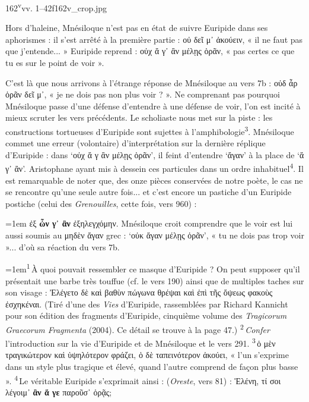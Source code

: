 \documentclass{thesmo}
\begin{document}
\begin{folio}{162\textsuperscript{v}}{vv. 1–42}{f162v_crop.jpg}
\begin{texte}
{Hors d'haleine, Mnésiloque n'est pas en état de suivre Euripide dans ses aphorismes : il s'est arrêté à la première partie : οὐ δεῖ μ᾽ ἀκούειν, « il ne faut pas que j'entende... » Euripide reprend : οὐχ ἅ γ᾽ ἂν μέλῃς ὁρᾶν, « pas certes ce que tu es sur le point de voir ».\par 
C'est là que nous arrivons à l'étrange réponse de Mnésiloque au vers 7b : οὐδ ἆρ ὁρᾶν δεῖ μ᾽, « je ne dois pas non plus voir ? ». Ne comprenant pas pourquoi  Mnésiloque passe d'une défense d'entendre à une défense de voir, l'on est incité à mieux scruter les vers précédents. 
Le scholiaste nous met sur la piste : les constructions tortueuses d'Euripide sont sujettes à l'amphibologie\textsuperscript{3}.
Mnésiloque commet une erreur (volontaire) d'interprétation sur la dernière réplique d'Euripide : dans `οὐχ ἅ γ ἂν μέλῃς ὁρᾶν', il feint d'entendre `ἄγαν' à la place de `ἅ γ᾽ ἂν'. Aristophane ayant mis à dessein ces particules dans un ordre inhabituel\textsuperscript{4}.
Il est remarquable de noter que, des onze pièces conservées de notre poète, le cas ne se rencontre qu'une seule autre fois... et c'est encore un pastiche d'un Euripide postiche (celui des \textit{Grenouilles}, cette fois, vers 960) :
\par{\leftskip=1em ἐξ \textbf{ὧν γ᾽ ἂν} ἐξηλεγχόμην.}
Mnésiloque croit comprendre que le voir est lui aussi soumis au μηδὲν ἄγαν grec : `οὐκ ἄγαν μέλῃς ὁρᾶν', « tu ne dois pas trop voir »... d'où sa réaction du vers 7b.\par 
\par{\fontsize{7.6}{9.4}\selectfont\leftskip=1em\noindent \textsuperscript{1}\,À quoi pouvait ressembler ce masque d'Euripide ? On peut supposer qu'il présentait une barbe très touffue (cf. le vers 190) ainsi que de multiples taches sur son visage : Ἐλέγετο δὲ καὶ βαθὺν πώγωνα θρέψαι καὶ ἐπὶ τῆς ὄψεως φακοὺς ἐσχηκέναι. (Tiré d'une des \textit{Vies} d'Euripide, rassemblées par Richard Kannicht pour son édition des fragments d'Euripide, cinquième volume des \textit{Tragicorum Graecorum Fragmenta} (2004). Ce détail se trouve à la page 47.) \textsuperscript{2}\,\textit{Confer} l'introduction sur la vie d'Euripide et de Mnésiloque et le vers 291. 
 \textsuperscript{3}\,ὁ μὲν τραγικώτερον καὶ ὑψηλότερον φράζει, ὁ δὲ ταπεινότερον ἀκούει, « l'un s'exprime dans un style plus tragique et élevé, quand l'autre comprend de façon plus basse ». \textsuperscript{4}\,Le véritable Euripide s'exprimait ainsi : (\textit{Oreste}, vers 81) : Ἑλένη, τί σοι λέγοιμ᾽ \textbf{ἂν ἅ γε} παροῦσ᾽ ὁρᾷς;\par}}

\end{texte}
\end{folio}
\end{document}
